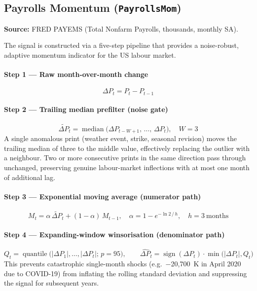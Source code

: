 \documentclass[11pt, a4paper]{article}
\begin{document}
\subsection{Payrolls Momentum (\texttt{PayrollsMom})}
\label{sec:payrolls}

\textbf{Source:} FRED PAYEMS (Total Nonfarm Payrolls, thousands, monthly SA).

The signal is constructed via a five-step pipeline that provides a noise-robust,
adaptive momentum indicator for the US labour market.

\paragraph{Step 1 — Raw month-over-month change}
\[
  \Delta P_t = P_t - P_{t-1}
\]

\paragraph{Step 2 — Trailing median prefilter (noise gate)}
\[
  \widetilde{\Delta P}_t = \operatorname{median}\!\bigl(\Delta P_{t-W+1},\,\ldots,\,\Delta P_t\bigr),
  \quad W = 3
\]
A single anomalous print (weather event, strike, seasonal revision) moves the
trailing median of three to the middle value, effectively replacing the outlier
with a neighbour. Two or more consecutive prints in the same direction pass
through unchanged, preserving genuine labour-market inflections with at most
one month of additional lag.

\paragraph{Step 3 — Exponential moving average (numerator path)}
\[
  M_t = \alpha\,\widetilde{\Delta P}_t + (1-\alpha)\,M_{t-1},
  \quad \alpha = 1 - e^{-\ln 2\,/\,h},\quad h = 3\ \text{months}
\]

\paragraph{Step 4 — Expanding-window winsorisation (denominator path)}
\[
  Q_t = \operatorname{quantile}\bigl(|\Delta P_1|,\ldots,|\Delta P_t|;\,p=95\bigr),
  \qquad
  \widehat{\Delta P}_t = \operatorname{sign}(\Delta P_t)\cdot\min\!\bigl(|\Delta P_t|, Q_t\bigr)
\]
This prevents catastrophic single-month shocks (e.g.\ $-$20{,}700~K in April
2020 due to COVID-19) from inflating the rolling standard deviation and
suppressing the signal for subsequent years.
\end{document}
